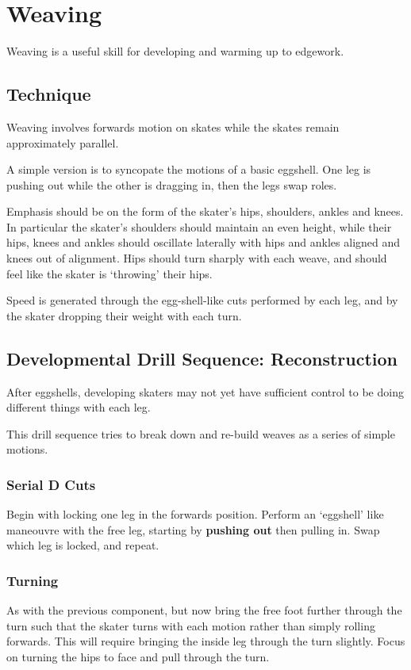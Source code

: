 \section{Weaving}
\label{sec:sticky/weaves}

Weaving is a useful skill for developing and warming up to edgework. 

\subsection*{Technique}

Weaving involves forwards motion on skates while the skates remain approximately parallel.   

A simple version is to syncopate the motions of a basic eggshell.  
One leg is pushing out while the other is dragging in, then the legs swap roles. 

Emphasis should be on the form of the skater's hips, shoulders, ankles and knees. 
In particular the skater's shoulders should maintain an even height, while their hips, knees and ankles should oscillate laterally with hips and ankles aligned and knees out of alignment.    
Hips should turn sharply with each weave, and should feel like the skater is `throwing' their hips. 


Speed is generated through the egg-shell-like cuts performed by each leg, and by the skater dropping their weight with each turn.  

\subsection*{Developmental Drill Sequence: Reconstruction}

After eggshells, developing skaters may not yet have sufficient control to be doing different things with each leg.       

This drill sequence tries to break down and re-build weaves as a series of simple motions.   

\subsubsection*{Serial D Cuts}
Begin with locking one leg in the forwards position.
Perform an `eggshell' like maneouvre with the free leg, starting by {\bf pushing out} then pulling in.
Swap which leg is locked, and repeat.


\subsubsection*{Turning}
As with the previous component, but now bring the free foot further through the turn such that the skater turns with each motion rather than simply rolling forwards. This will require bringing the inside leg through the turn slightly.    
Focus on turning the hips to face and pull through the turn.

